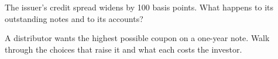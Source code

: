 \begin{interviewq}\label{iq:dv:the-structured-products-business:5}
The issuer's credit spread widens by 100 basis points. What happens to its outstanding notes and to its accounts?
\end{interviewq}

\begin{interviewq}\label{iq:dv:the-structured-products-business:6}
A distributor wants the highest possible coupon on a one-year note. Walk through the choices that raise it and what each costs the investor.
\end{interviewq}
